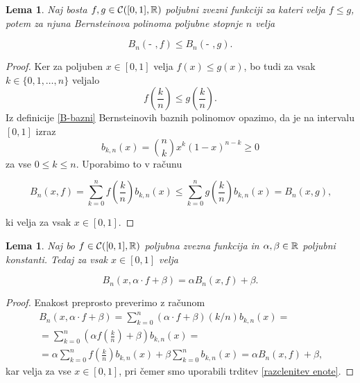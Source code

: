 \documentclass[a4paper, reqno]{amsart}
\theoremstyle{theorem}
\newtheorem{lema}[izrek]{Lema}
\theoremstyle{definition}
\begin{document}
\begin{lema}
	\label{monotonost}
	Naj bosta $f, g \in \mathcal{C}([0,1],\mathbb{R})$ poljubni zvezni funkciji za kateri velja $f \leq g$, potem za
	njuna Bernsteinova polinoma poljubne stopnje $n$ velja

	$$ B_n(\text{- },f) \leq B_n(\text{- },g)\text{.}$$ 
\end{lema}

\begin{proof}
	Ker za poljuben $x \in [0,1]$ velja $f(x) \leq g(x)$, bo tudi za vsak $k \in \{0,1,\dots, n\}$
	veljalo
	$$ f\left(\frac kn\right) \leq g\left(\frac kn\right)\text{.}$$
	Iz definicije \ref{B-bazni} Bernsteinovih baznih polinomov opazimo, da je na intervalu $[0,1]$
	izraz
	$$b_{k,n}(x)= \binom nk x^k(1 - x)^{n - k} \geq 0$$
	za vse $0 \leq k \leq n$.
	Uporabimo to v računu

	$$ B_n(x, f) = \sum_{k = 0}^n f\left(\frac kn\right)b_{k,n}(x) \leq 
	\sum_{k = 0}^n g\left(\frac kn\right)b_{k,n}(x) = B_n(x, g)\text{,}$$

\noindent
	ki velja za vsak $x \in [0,1]$.
\end{proof}

\begin{lema}
	\label{linearnost}
	Naj bo $f \in \mathcal{C}([0,1],\mathbb{R})$ poljubna zvezna funkcija in $\alpha, \beta \in \mathbb{R}$ poljubni konstanti.
	Tedaj za vsak $x \in [0,1]$ velja 

	$$ B_n(x, \alpha \cdot f + \beta) = \alpha B_n(x, f) + \beta\text{.}$$
\end{lema}

\begin{proof}
	Enakost preprosto preverimo z računom
	\begin{multline*}
	B_n(x, \alpha \cdot f + \beta) = 
	\sum_{k = 0}^n (\alpha \cdot f + \beta)\left( k/n \right)b_{k,n}(x) =\\
	= \sum_{k = 0}^n (\alpha f\left(\frac kn \right) + \beta)b_{k,n}(x) =\\
	= \alpha \sum_{k = 0}^n f\left(\frac kn\right)b_{k,n}(x) + \beta \sum_{k = 0}^n b_{k,n}(x) =
	\alpha B_n(x, f) + \beta\text{,}
\end{multline*}
kar velja za vse $x \in [0,1]$, pri čemer smo uporabili trditev \ref{razclenitev enote}.
\end{proof}
\end{document}
